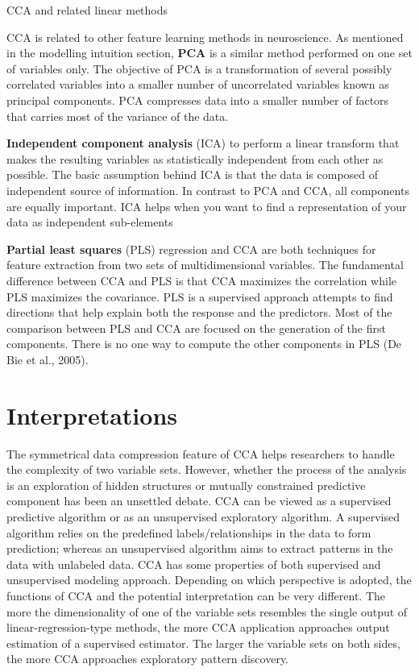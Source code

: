 \begin{infobox}{CCA and related linear methods}

CCA is related to other feature learning methods in neuroscience. As mentioned in the modelling intuition section, \textbf{PCA} is a similar method performed on one set of variables only. The objective of PCA is a transformation of several possibly correlated variables into a smaller number of uncorrelated variables known as principal components. PCA compresses data into a smaller number of factors that carries most of the variance of the data.

\textbf{Independent component analysis} (ICA) to perform a linear transform that makes the resulting variables as statistically independent from each other as possible. The basic assumption behind ICA is that the data is composed of independent source of information. In contrast to PCA and CCA, all components are equally important.  ICA helps when you want to find a representation of your data as independent sub-elements

\textbf{Partial least squares} (PLS) regression and CCA are both techniques for feature extraction from two sets of multidimensional variables. The fundamental difference between CCA and PLS is that CCA maximizes the correlation while PLS maximizes the covariance. PLS is a supervised approach attempts to find directions that help explain both the response and the predictors. Most of the comparison between PLS and CCA are focused on the generation of the first components. There is no one way to compute the other components in PLS (De Bie et al., 2005).
\end{infobox}


\section{Interpretations}
\label{cca:interpretations}
The symmetrical data compression feature of CCA helps researchers to handle the complexity of two variable sets. However, whether the process of the analysis is an exploration of hidden structures or mutually constrained predictive component has been an unsettled debate. CCA can be viewed as a supervised predictive algorithm or as an unsupervised exploratory algorithm. A supervised algorithm relies on the predefined labels/relationships in the data to form prediction; whereas an unsupervised algorithm aims to extract patterns in the data with unlabeled data. CCA has some properties of both supervised and unsupervised modeling approach. Depending on which perspective is adopted, the functions of CCA and the potential interpretation can be very different.  The more the dimensionality of one of the variable sets resembles the single output of linear-regression-type methods, the more CCA application approaches output estimation of a supervised estimator. The larger the variable sets on both sides, the more CCA approaches exploratory pattern discovery.

